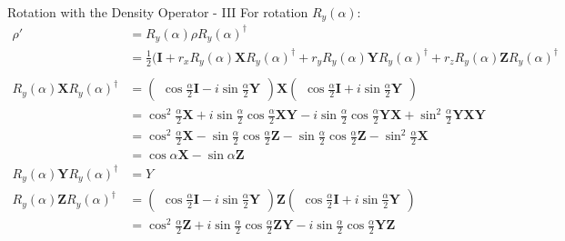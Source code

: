 \documentclass{beamer}
\begin{document}
\begin{frame}{Rotation with the Density Operator - III}
  {\tiny
    For rotation $R_y(\alpha)$:
    \begin{align*}
      \rho' &= R_y(\alpha) \rho R_y(\alpha)^{\dagger} \\
            &= \frac{1}2(\mathbf{I}  + r_x R_y(\alpha) \mathbf{X} R_y(\alpha)^{\dagger}
                                     + r_y R_y(\alpha) \mathbf{Y} R_y(\alpha)^{\dagger}
                                     + r_z R_y(\alpha) \mathbf{Z} R_y(\alpha)^{\dagger} \\
      \\
      R_y(\alpha) \mathbf{X} R_y(\alpha)^{\dagger}
            &=    \begin{pmatrix} \cos\frac{\alpha}2\mathbf{I} - i\sin\frac{\alpha}2 \mathbf{Y} \end{pmatrix}
                  \mathbf{X}
                  \begin{pmatrix} \cos\frac{\alpha}2\mathbf{I} + i\sin\frac{\alpha}2 \mathbf{Y} \end{pmatrix} \\
            &=    \cos^2\frac{\alpha}2 \mathbf{X}
                + i\sin\frac{\alpha}2 \cos\frac{\alpha}2 \mathbf{X}\mathbf{Y}
                - i\sin\frac{\alpha}2 \cos\frac{\alpha}2 \mathbf{Y}\mathbf{X}
                + \sin^2\frac{\alpha}2 \mathbf{Y}\mathbf{X}\mathbf{Y} \\
            &=    \cos^2\frac{\alpha}2 \mathbf{X}
                - \sin\frac{\alpha}2 \cos\frac{\alpha}2 \mathbf{Z}
                - \sin\frac{\alpha}2 \cos\frac{\alpha}2 \mathbf{Z}
                - \sin^2\frac{\alpha}2 \mathbf{X} \\
            &=    \cos\alpha \mathbf{X} - \sin\alpha \mathbf{Z} \\
      R_y(\alpha) \mathbf{Y} R_y(\alpha)^{\dagger}
            &= Y \\
      R_y(\alpha) \mathbf{Z} R_y(\alpha)^{\dagger}
            &=    \begin{pmatrix} \cos\frac{\alpha}2\mathbf{I} - i\sin\frac{\alpha}2 \mathbf{Y} \end{pmatrix}
                  \mathbf{Z}
                  \begin{pmatrix} \cos\frac{\alpha}2\mathbf{I} + i\sin\frac{\alpha}2 \mathbf{Y} \end{pmatrix} \\
            &=    \cos^2\frac{\alpha}2 \mathbf{Z}
                + i\sin\frac{\alpha}2 \cos\frac{\alpha}2 \mathbf{Z}\mathbf{Y}
                - i\sin\frac{\alpha}2 \cos\frac{\alpha}2 \mathbf{Y}\mathbf{Z}

\end{align*}}
\end{frame}
\end{document}
